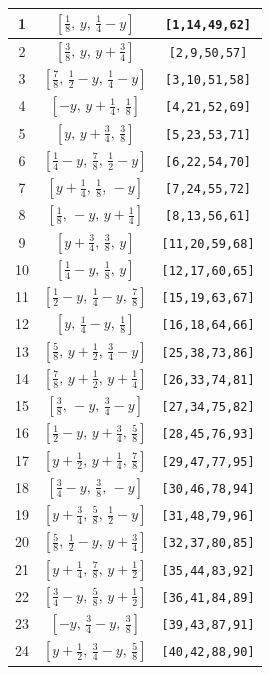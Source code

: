\documentclass[fleqn,8pt]{jsarticle}
\begin{document}
\begin{longtable}{ccc}
1 & $\left[ \frac{1}{8},\, y,\, \frac{1}{4} - y \right]$ & {\tt [1,14,49,62]} \\ \hline
2 & $\left[ \frac{3}{8},\, y,\, y + \frac{3}{4} \right]$ & {\tt [2,9,50,57]} \\ \hline
3 & $\left[ \frac{7}{8},\, \frac{1}{2} - y,\, \frac{1}{4} - y \right]$ & {\tt [3,10,51,58]} \\ \hline
4 & $\left[ - y,\, y + \frac{1}{4},\, \frac{1}{8} \right]$ & {\tt [4,21,52,69]} \\ \hline
5 & $\left[ y,\, y + \frac{3}{4},\, \frac{3}{8} \right]$ & {\tt [5,23,53,71]} \\ \hline
6 & $\left[ \frac{1}{4} - y,\, \frac{7}{8},\, \frac{1}{2} - y \right]$ & {\tt [6,22,54,70]} \\ \hline
7 & $\left[ y + \frac{1}{4},\, \frac{1}{8},\, - y \right]$ & {\tt [7,24,55,72]} \\ \hline
8 & $\left[ \frac{1}{8},\, - y,\, y + \frac{1}{4} \right]$ & {\tt [8,13,56,61]} \\ \hline
9 & $\left[ y + \frac{3}{4},\, \frac{3}{8},\, y \right]$ & {\tt [11,20,59,68]} \\ \hline
10 & $\left[ \frac{1}{4} - y,\, \frac{1}{8},\, y \right]$ & {\tt [12,17,60,65]} \\ \hline
11 & $\left[ \frac{1}{2} - y,\, \frac{1}{4} - y,\, \frac{7}{8} \right]$ & {\tt [15,19,63,67]} \\ \hline
12 & $\left[ y,\, \frac{1}{4} - y,\, \frac{1}{8} \right]$ & {\tt [16,18,64,66]} \\ \hline
13 & $\left[ \frac{5}{8},\, y + \frac{1}{2},\, \frac{3}{4} - y \right]$ & {\tt [25,38,73,86]} \\ \hline
14 & $\left[ \frac{7}{8},\, y + \frac{1}{2},\, y + \frac{1}{4} \right]$ & {\tt [26,33,74,81]} \\ \hline
15 & $\left[ \frac{3}{8},\, - y,\, \frac{3}{4} - y \right]$ & {\tt [27,34,75,82]} \\ \hline
16 & $\left[ \frac{1}{2} - y,\, y + \frac{3}{4},\, \frac{5}{8} \right]$ & {\tt [28,45,76,93]} \\ \hline
17 & $\left[ y + \frac{1}{2},\, y + \frac{1}{4},\, \frac{7}{8} \right]$ & {\tt [29,47,77,95]} \\ \hline
18 & $\left[ \frac{3}{4} - y,\, \frac{3}{8},\, - y \right]$ & {\tt [30,46,78,94]} \\ \hline
19 & $\left[ y + \frac{3}{4},\, \frac{5}{8},\, \frac{1}{2} - y \right]$ & {\tt [31,48,79,96]} \\ \hline
20 & $\left[ \frac{5}{8},\, \frac{1}{2} - y,\, y + \frac{3}{4} \right]$ & {\tt [32,37,80,85]} \\ \hline
21 & $\left[ y + \frac{1}{4},\, \frac{7}{8},\, y + \frac{1}{2} \right]$ & {\tt [35,44,83,92]} \\ \hline
22 & $\left[ \frac{3}{4} - y,\, \frac{5}{8},\, y + \frac{1}{2} \right]$ & {\tt [36,41,84,89]} \\ \hline
23 & $\left[ - y,\, \frac{3}{4} - y,\, \frac{3}{8} \right]$ & {\tt [39,43,87,91]} \\ \hline
24 & $\left[ y + \frac{1}{2},\, \frac{3}{4} - y,\, \frac{5}{8} \right]$ & {\tt [40,42,88,90]} \\
\end{longtable}
\end{document}
